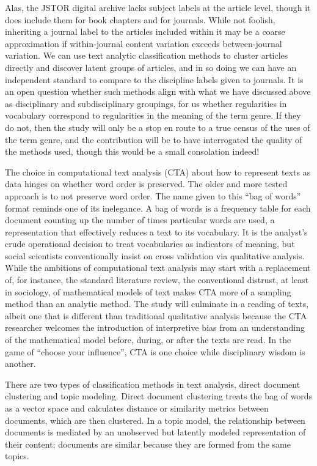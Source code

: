 \documentclass[]{book}
\theoremstyle{definition}
\theoremstyle{definition}
\theoremstyle{definition}
\theoremstyle{remark}
\begin{document}
Alas, the JSTOR digital archive lacks subject labels at the article
level, though it does include them for book chapters and for journals.
While not foolish, inheriting a journal label to the articles included
within it may be a coarse approximation if within-journal content
variation exceeds between-journal variation. We can use text analytic
classification methods to cluster articles directly and discover latent
groups of articles, and in so doing we can have an independent standard
to compare to the discipline labels given to journals. It is an open
question whether such methods align with what we have discussed above as
disciplinary and subdisciplinary groupings, for us whether regularities
in vocabulary correspond to regularities in the meaning of the term
genre. If they do not, then the study will only be a stop en route to a
true census of the uses of the term genre, and the contribution will be
to have interrogated the quality of the methods used, though this would
be a small consolation indeed!

The choice in computational text analysis (CTA) about how to represent
texts as data hinges on whether word order is preserved. The older and
more tested approach is to not preserve word order. The name given to
this ``bag of words'' format reminds one of its inelegance. A bag of
words is a frequency table for each document counting up the number of
times particular words are used, a representation that effectively
reduces a text to its vocabulary. It is the analyst's crude operational
decision to treat vocabularies as indicators of meaning, but social
scientists conventionally insist on cross validation via qualitative
analysis. While the ambitions of computational text analysis may start
with a replacement of, for instance, the standard literature review, the
conventional distrust, at least in sociology, of mathematical models of
text makes CTA more of a sampling method than an analytic method. The
study will culminate in a reading of texts, albeit one that is different
than traditional qualitative analysis because the CTA researcher
welcomes the introduction of interpretive bias from an understanding of
the mathematical model before, during, or after the texts are read. In
the game of ``choose your influence'', CTA is one choice while
disciplinary wisdom is another.

There are two types of classification methods in text analysis, direct
document clustering and topic modeling. Direct document clustering
treats the bag of words as a vector space and calculates distance or
similarity metrics between documents, which are then clustered. In a
topic model, the relationship between documents is mediated by an
unobserved but latently modeled representation of their content;
documents are similar because they are formed from the same topics.
\end{document}
